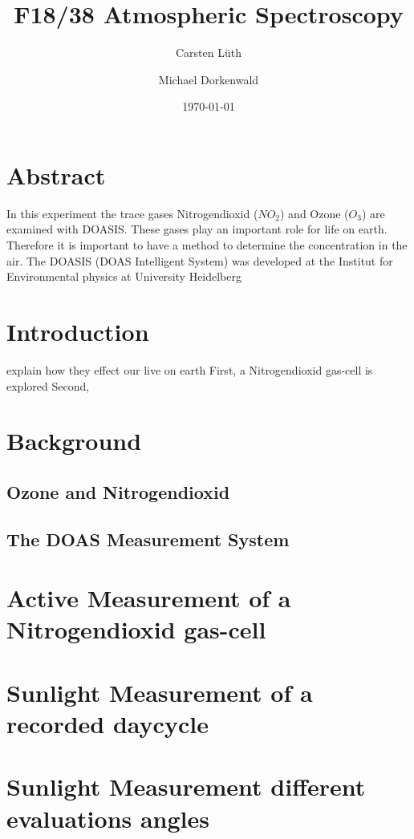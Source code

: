 \documentclass[12pt, english]{scrartcl} %
\title{F18/38 Atmospheric Spectroscopy}
\author{Carsten L{\"u}th \and Michael Dorkenwald}
\date{\today}
\begin{document}
\maketitle

\begin{multicols}{2}


\section{Abstract}
In this experiment the trace gases Nitrogendioxid ($NO_2$) and Ozone ($O_3$) are examined with DOASIS. These gases play an important role for life on earth. Therefore it is important to have a method to determine the concentration in the air. The DOASIS (DOAS Intelligent System) was developed at the Institut for Environmental physics at University Heidelberg
\section{Introduction}

explain how they effect our live on earth 
First, a Nitrogendioxid gas-cell is explored 
Second, 

\section{Background}

\subsection{Ozone and Nitrogendioxid}

\subsection{The DOAS Measurement System}

\newpage

\section{Active Measurement of a Nitrogendioxid gas-cell}


\section{Sunlight Measurement of a recorded daycycle}

\section{Sunlight Measurement different evaluations angles}

\end{multicols}
\end{document}
